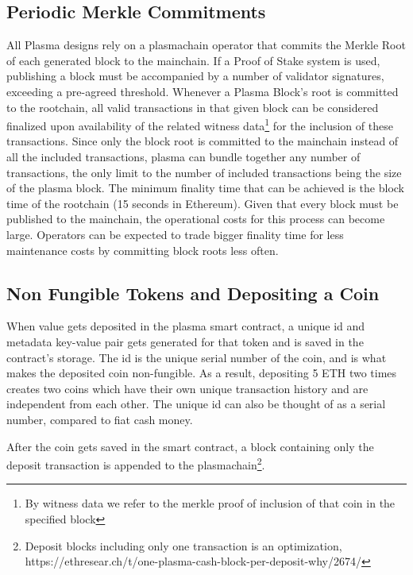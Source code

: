 \subsection{Periodic Merkle Commitments}
All Plasma designs rely on a plasmachain operator that commits the
Merkle Root of each generated block to the mainchain. If a Proof of Stake system is used, publishing a block must be accompanied by a number of validator signatures, exceeding a pre-agreed threshold. 
Whenever a Plasma Block's root is committed to the rootchain, all valid
transactions in that given block can be considered finalized upon availability of the related witness data\footnote{By witness data we refer to the merkle proof of inclusion of that coin in the specified block} for the inclusion of these transactions. Since only the
block root is committed to the mainchain instead of all the included
transactions, plasma can bundle together any number of transactions, the only limit to the number of included transactions being the size of the plasma block. The minimum finality time that
can be achieved is the block time of the rootchain (15 seconds in Ethereum).
Given that every block must be published to the mainchain, the operational costs for this process can become large. Operators can be expected to trade bigger finality time for less maintenance costs by committing block roots less often.


\subsection{Non Fungible Tokens and Depositing a Coin}

When value gets deposited in the plasma smart contract, a unique id and metadata key-value pair gets generated for that token and is saved in the contract's storage. The id is the unique serial number of the coin, and is what makes the deposited coin non-fungible. As a result, depositing 5 ETH two times creates two coins which have their own unique transaction history and are independent from each other. The unique id can also be thought of as a serial number, compared to fiat cash money.

After the coin gets saved in the smart contract, a block containing only the deposit transaction is appended to the plasmachain\footnote{Deposit blocks including only one transaction is an optimization, https://ethresear.ch/t/one-plasma-cash-block-per-deposit-why/2674/}.

% 
% 
